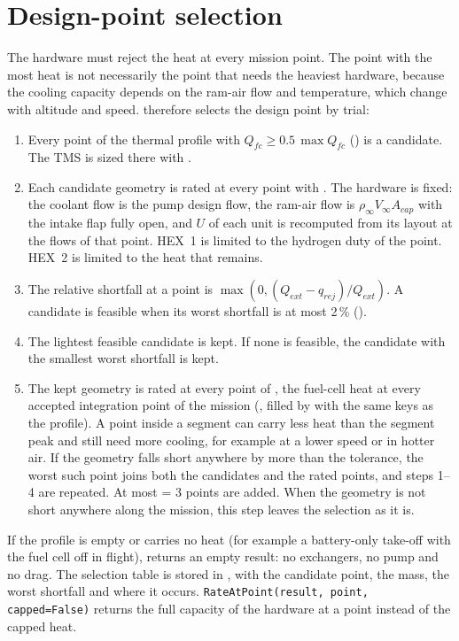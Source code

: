 \documentclass[a4paper,11pt]{article}
\newcommand{\Qfc}{Q_{fc}}
\newcommand{\Qext}{Q_{ext}}
\begin{document}
\section{Design-point selection}\label{sec:design-point}

The hardware must reject the heat at every mission point. The point with the most heat is
not necessarily the point that needs the heaviest hardware, because the cooling capacity
depends on the ram-air flow and temperature, which change with altitude and speed.
 therefore selects the design point by trial:
\begin{enumerate}
\item Every point of the thermal profile with $\Qfc \ge 0.5\,\max\Qfc$
  () is a candidate. The TMS is sized there with
  .
\item Each candidate geometry is rated at every point with . The hardware
  is fixed: the coolant flow is the pump design flow, the ram-air flow is
  $\rho_\infty V_\infty A_{cap}$ with the intake flap fully open, and $U$ of each unit is
  recomputed from its layout at the flows of that point. HEX~1 is limited to the hydrogen duty of the
  point. HEX~2 is limited to the heat that remains.
\item The relative shortfall at a point is $\max(0, (\Qext - q_{rej})/\Qext)$. A candidate is
  feasible when its worst shortfall is at most 2\,\% ().
\item The lightest feasible candidate is kept. If none is feasible, the candidate with the
  smallest worst shortfall is kept.
\item The kept geometry is rated at every point of , the fuel-cell heat at every
  accepted integration point of the mission (, filled by
   with the same keys as the profile). A point inside a segment
  can carry less heat than the segment peak and still need more cooling, for example at a
  lower speed or in hotter air. If the geometry falls short anywhere by more than the
  tolerance, the worst such point joins both the candidates and the rated points, and
  steps 1--4 are repeated. At most  = 3 points are added. When
  the geometry is not short anywhere along the mission, this step leaves the selection as it
  is.
\end{enumerate}
If the profile is empty or carries no heat (for example a battery-only take-off with the fuel
cell off in flight),  returns an empty result: no exchangers, no pump
and no drag. The selection table is stored in , with the candidate point, the
mass, the worst shortfall and where it occurs. \texttt{RateAtPoint(result, point,
capped=False)} returns the full capacity of the hardware at a point instead of the capped
heat.
\end{document}
